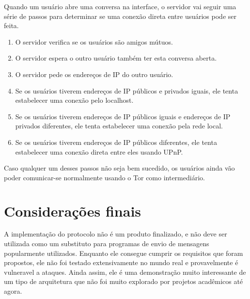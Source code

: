Quando um usuário abre uma conversa na interface, o servidor vai seguir uma série de passos para determinar se uma conexão direta entre usuários pode ser feita.
\begin{enumerate}
    \item O servidor verifica se os usuários são amigos mútuos.
    \item O servidor espera o outro usuário também ter esta conversa aberta.
    \item O servidor pede os endereços de IP do outro usuário.
    \item Se os usuários tiverem endereços de IP públicos e privados iguais, ele tenta estabelecer uma conexão pelo localhost.
    \item Se os usuários tiverem endereços de IP públicos iguais e endereços de IP privados diferentes, ele tenta estabelecer uma conexão pela rede local.
    \item Se os usuários tiverem endereços de IP públicos diferentes, ele tenta estabelecer uma conexão direta entre eles usando UPnP.
\end{enumerate}

Caso qualquer um desses passos não seja bem sucedido, os usuários ainda vão poder comunicar-se normalmente usando o Tor como intermediário.

\section{Considerações finais}

A implementação do protocolo não é um produto finalizado, e não deve ser utilizada como um substituto para programas de envio de mensagens popularmente utilizados. Enquanto ele consegue cumprir os requisitos que foram propostos, ele não foi testado extensivamente no mundo real e provavelmente é vulneravel a ataques. Ainda assim, ele é uma demonstração muito interessante de um tipo de arquitetura que não foi muito explorado por projetos acadêmicos até agora.